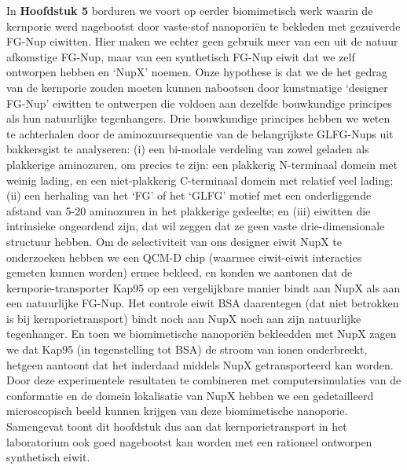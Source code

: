 {	\noindent In \textbf{Hoofdstuk 5} borduren we voort op eerder biomimetisch werk waarin de kernporie werd nagebootst door vaste-stof nano\-poriën te bekleden met gezuiverde FG-Nup eiwitten. Hier maken we echter geen gebruik meer van een uit de natuur afkomstige FG-Nup, maar van een synthetisch FG-Nup eiwit dat we zelf ontworpen hebben en `NupX' noemen. Onze hypothese is dat we de het gedrag van de kernporie zouden moeten kunnen nabootsen door kunstmatige `designer FG-Nup' eiwitten te ontwerpen die voldoen aan dezelfde bouwkundige principes als hun natuurlijke tegenhangers. Drie bouwkundige principes hebben we weten te achterhalen door de aminozuursequentie van de belangrijkste GLFG-Nups uit bakkersgist te analyseren: (i) een bi-modale verdeling van zowel geladen als plakkerige aminozuren, om precies te zijn: een plakkerig N-terminaal domein met weinig lading, en een niet-plakkerig C-terminaal domein met relatief veel lading; (ii) een herhaling van het `FG' of het `GLFG' motief met een onderliggende afstand van 5-20 aminozuren in het plakkerige gedeelte; en (iii) eiwitten die intrinsieke ongeordend zijn, dat wil zeggen dat ze geen vaste drie-dimensionale structuur hebben.
	Om de selectiviteit van ons designer eiwit NupX te onderzoeken hebben we een QCM-D chip (waarmee eiwit-eiwit interacties gemeten kunnen worden) ermee bekleed, en konden we aantonen dat de kernporie-transporter Kap95 op een vergelijkbare manier bindt aan NupX als aan een natuurlijke FG-Nup. Het controle eiwit BSA daarentegen (dat niet betrokken is bij kernporietransport) bindt noch aan NupX noch aan zijn natuurlijke tegenhanger. En toen we biomimetische nano\-poriën bekleedden met NupX zagen we dat Kap95 (in tegenstelling tot BSA) de stroom van ionen onderbreekt, hetgeen aantoont dat het inderdaad middels NupX getransporteerd kan worden. Door deze experimentele resultaten te combineren met computersimulaties van de conformatie en de domein lokalisatie van NupX hebben we een gedetailleerd microscopisch beeld kunnen krijgen van deze biomimetische nanoporie. Samengevat toont dit hoofdstuk dus aan dat kernporietransport in het laboratorium ook goed nagebootst kan worden met een rationeel ontworpen synthetisch eiwit.\\[0.5pt]
	
}
